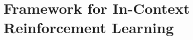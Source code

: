 \documentclass[10pt]{article}
\newcommand{\<}{\left\langle}
\renewcommand{\>}{\right\rangle}
\newcommand{\authnote}[2]{{\scriptsize $\ll$\textsf{#1 notes: #2}$\gg$}}
\newcommand{\authnote}[2]{}
\newcommand{\yub}[1]{{\color{red}\authnote{Yu}{#1}}}
\newcommand{\lc}[1]{{\color{blue}\authnote{Licong}{#1}}}
\begin{document}







\section{Framework for In-Context Reinforcement Learning}\label{sec:framework}


\end{document}
